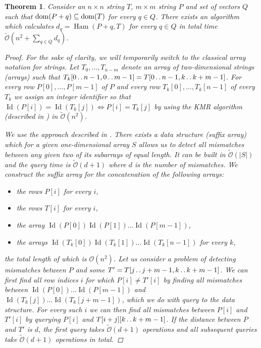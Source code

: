 \documentclass[11pt]{article}
\def\dd{\mathinner{.\,.}}
\renewcommand{\O}{\mathcal{O}}
\newcommand{\tO}{\tilde{\mathcal{O}}}
\theoremstyle{plain}
\newtheorem{theorem}{Theorem}
\theoremstyle{definition}
\theoremstyle{remark}
\DeclareMathOperator*{\Ham}{Ham}
\DeclareMathOperator*{\ID}{Id}
\begin{document}
\begin{theorem}\label{kangaroos}
	Consider an $n \times n$ string $T$, $m \times m$ string $P$ and set of vectors $Q$ such that $\operatorname*{dom}(P + q) \subseteq \operatorname*{dom}(T)$ for every $q \in Q$.
	There exists an algorithm which calculates $ d_q = \Ham(P + q, T) $ for every $q \in Q$ in total time $\tO(n^2 + \sum_{q \in Q} d_q)$.
	\begin{proof}
		For the sake of clarity, we will temporarily switch to the classical array notation for strings.
		Let $T_0, \dots, T_{n - m}$ denote an array of two-dimensional strings (arrays) such that $T_k[0 \dd n - 1, 0 \dd m - 1] = T[0 \dd n - 1, k \dd k + m - 1]$.
		For every row $P[0], \dots, P[m - 1]$ of $P$ and every row $T_k[0], \dots, T_k[n - 1]$ of every $T_k$ we assign an integer identifier so that $\ID(P[i]) = \ID(T_k[j]) \Leftrightarrow P[i] = T_k[j]$ by using the KMR algorithm (described in \cite{Karp1972}) in $\tO(n^2)$.
		
		We use the approach described in \cite{Galil1986}.
		There exists a data structure (suffix array) which for a given one-dimensional array $S$ allows us to detect all mismatches between any given two of its subarrays of equal length.
		It can be built in $\tO(|S|)$ and the query time is $\tO(d + 1)$ where $d$ is the number of mismatches.
		We construct the suffix array for the concatenation of the following arrays:
		\begin{itemize}
			\item the rows $P[i]$ for every $i$,
			\item the rows $T[i]$ for every $i$,
			\item the array $\ID(P[0]) \ID(P[1]) \dots \ID(P[m - 1])$,
			\item the arrays $\ID(T_k[0]) \ID(T_k[1]) \dots \ID(T_k[n - 1])$ for every $k$,
		\end{itemize}
		the total length of which is $\O(n^2)$.
		Let us consider a problem of detecting mismatches between $P$ and some $T' = T[j \dd j + m - 1, k \dd k + m - 1]$.
		We can first find all row indices $i$ for which $P[i] \neq T'[i]$ by finding all mismatches between $\ID(P[0]) \dots \ID(P[m - 1])$ and $\ID(T_k[j]) \dots \ID(T_k[j + m - 1])$, which we do with query to the data structure.
		For every such $i$ we can then find all mismatches between $P[i]$ and $T'[i]$ by querying $P[i]$ and $T[i + j][k \dd k + m - 1]$.
		If the distance between $P$ and $T'$ is $d$, the first query takes $\tO(d + 1)$ operations and all subsequent queries take $\tO(d + 1)$ operations in total.
	\end{proof}
\end{theorem}
\end{document}

